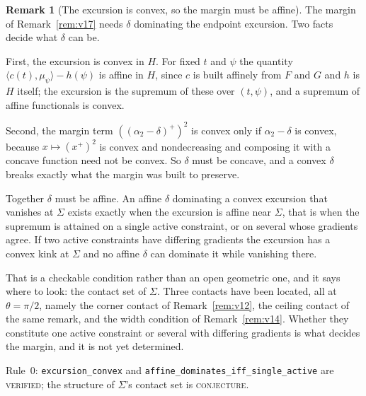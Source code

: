 \documentclass[11pt]{article}
\theoremstyle{definition}
\newtheorem{remark}[theorem]{Remark}
\newcommand{\Sig}{\Sigma}
\begin{document}
\begin{remark}[The excursion is convex, so the margin must be affine]\label{rem:v18}
The margin of Remark~\ref{rem:v17} needs $\delta$ dominating the endpoint excursion. Two facts
decide what $\delta$ can be.

First, the excursion is convex in $H$. For fixed $t$ and $\psi$ the quantity
$\langle c(t),\mu_\psi\rangle-h(\psi)$ is affine in $H$, since $c$ is built affinely from $F$
and $G$ and $h$ is $H$ itself; the excursion is the supremum of these over $(t,\psi)$, and a
supremum of affine functionals is convex.

Second, the margin term $((\alpha_2-\delta)^+)^2$ is convex only if $\alpha_2-\delta$ is
convex, because $x\mapsto(x^+)^2$ is convex and nondecreasing and composing it with a concave
function need not be convex. So $\delta$ must be concave, and a convex $\delta$ breaks exactly
what the margin was built to preserve.

Together $\delta$ must be affine. An affine $\delta$ dominating a convex excursion that
vanishes at $\Sig$ exists exactly when the excursion is affine near $\Sig$, that is when the
supremum is attained on a single active constraint, or on several whose gradients agree. If
two active constraints have differing gradients the excursion has a convex kink at $\Sig$ and
no affine $\delta$ can dominate it while vanishing there.

That is a checkable condition rather than an open geometric one, and it says where to look:
the contact set of $\Sig$. Three contacts have been located, all at $\theta=\pi/2$, namely the
corner contact of Remark~\ref{rem:v12}, the ceiling contact of the same remark, and the width
condition of Remark~\ref{rem:v14}. Whether they constitute one active constraint or several
with differing gradients is what decides the margin, and it is not yet determined.

Rule~0: \verb|excursion_convex| and \verb|affine_dominates_iff_single_active| are
\textsc{verified}; the structure of $\Sig$'s contact set is \textsc{conjecture}.
\end{remark}
\end{document}
